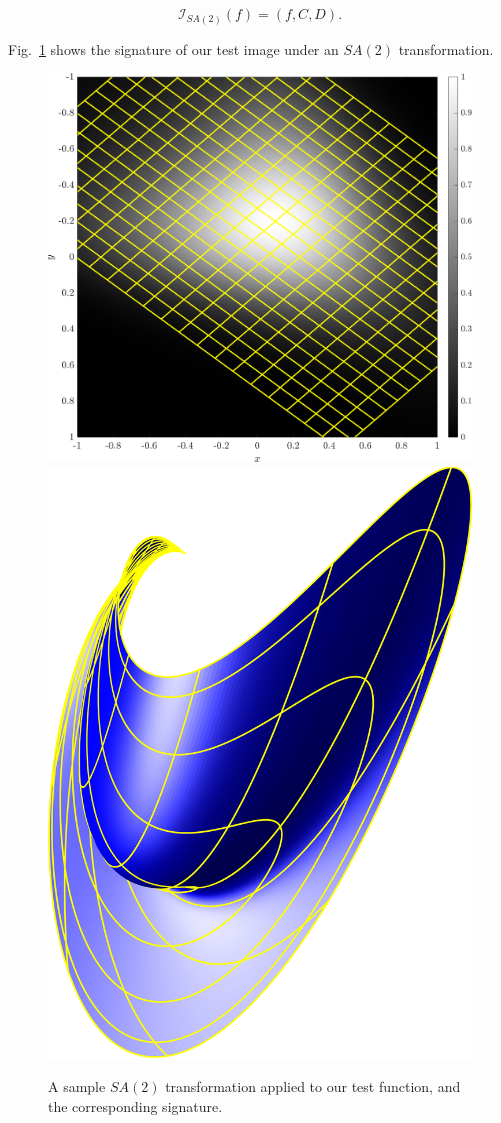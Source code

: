 \documentclass[review,onefignum,onetabnum]{siamonline190516}
\begin{document}
\begin{equation}
    \label{eq:SA2signature}
    \mathcal{I}_{SA(2)}(f) = \left(f, C, D \right).
\end{equation}

Fig.~\ref{fig:SA2} shows the signature of our test image under an $SA(2)$ transformation.

\begin{figure}
\centering
\includegraphics[width=.45\textwidth]{Figs/f_transformed_SA2.png}
\includegraphics[width=.45\textwidth]{Figs/SA2_signature.png}
\caption{A sample $SA(2)$ transformation applied to our test function, and the corresponding signature.}
\label{fig:SA2}
\end{figure}
\end{document}
